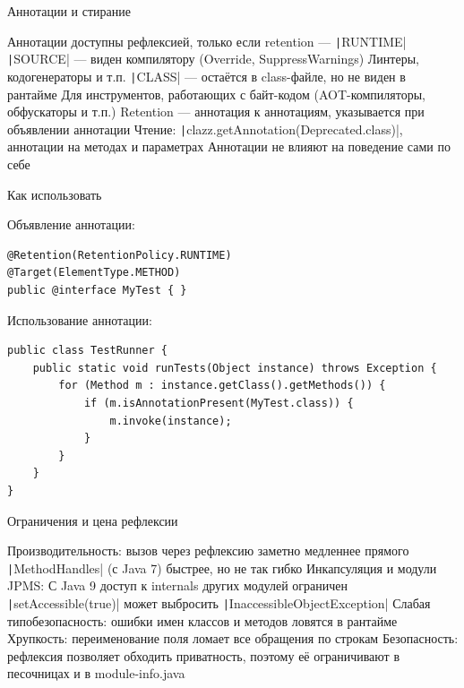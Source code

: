 \documentclass{../../slides-style}
\begin{document}
    \begin{frame}{Аннотации и стирание}
        \begin{outline}
            \1 Аннотации доступны рефлексией, только если retention --- \texttt|RUNTIME|
                \2 \texttt|SOURCE| --- виден компилятору (Override, SuppressWarnings)
                    \3 Линтеры, кодогенераторы и т.п.
                \2 \texttt|CLASS| --- остаётся в class-файле, но не виден в рантайме
                    \3 Для инструментов, работающих с байт-кодом (AOT-компиляторы, обфускаторы и т.п.)
                \2 Retention --- аннотация к аннотациям, указывается при объявлении аннотации
            \1 Чтение: \texttt|clazz.getAnnotation(Deprecated.class)|, аннотации на методах и параметрах
            \1 Аннотации не влияют на поведение сами по себе
        \end{outline}
    \end{frame}

    \begin{frame}[fragile]{Как использовать}
        \begin{small}
            Объявление аннотации:
            \begin{verbatim}
@Retention(RetentionPolicy.RUNTIME)
@Target(ElementType.METHOD)
public @interface MyTest { }
            \end{verbatim}

            \vspace{5mm}
            Использование аннотации:
            \begin{verbatim}
public class TestRunner {
    public static void runTests(Object instance) throws Exception {
        for (Method m : instance.getClass().getMethods()) {
            if (m.isAnnotationPresent(MyTest.class)) {
                m.invoke(instance);
            }
        }
    }
}
            \end{verbatim}
        \end{small}
    \end{frame}

    \begin{frame}{Ограничения и цена рефлексии}
        \begin{outline}
            \1 Производительность: вызов через рефлексию заметно медленнее прямого
                \2 \texttt|MethodHandles| (с Java 7) быстрее, но не так гибко
            \1 Инкапсуляция и модули JPMS:
                \2 С Java 9 доступ к internals других модулей ограничен
                \2 \texttt|setAccessible(true)| может выбросить \texttt|InaccessibleObjectException|
            \1 Слабая типобезопасность: ошибки имен классов и методов ловятся в рантайме
            \1 Хрупкость: переименование поля ломает все обращения по строкам
            \1 Безопасность: рефлексия позволяет обходить приватность, поэтому её ограничивают в песочницах и в module-info.java
        \end{outline}
    \end{frame}
\end{document}

